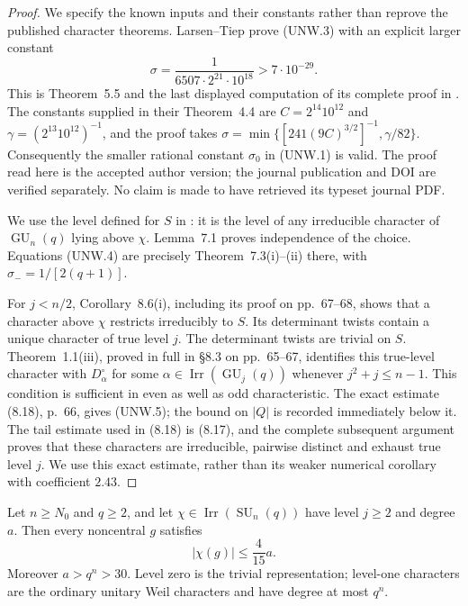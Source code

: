 \begin{proof}
We specify the known inputs and their constants rather than reprove
the published character theorems.
Larsen--Tiep prove (UNW.3) with an explicit larger constant
\[
 \sigma=\frac1{6507\cdot2^{21}\cdot10^{18}}>7\cdot10^{-29}.
                                                               \tag{UNW.6}
\]
This is Theorem~5.5 and the last displayed computation of its
complete proof in \cite[accepted-author version, pp.~25--26]{UNW:LT2024}.
The constants supplied in their Theorem~4.4 are
$C=2^{14}10^{12}$ and $\gamma=(2^{13}10^{12})^{-1}$, and the proof
takes
$\sigma=\min\{[241(9C)^{3/2}]^{-1},\gamma/82\}$.
Consequently the smaller rational constant $\sigma_0$ in (UNW.1)
is valid.  The proof read here is the accepted author version;
the journal publication and DOI are verified separately.  No claim
is made to have retrieved its typeset journal PDF.

We use the level defined for $S$ in
\cite[Definition~2 and Lemma~7.1, pp.~51--52]{UNW:GLT2020}:
it is the level of any irreducible character of
$\operatorname{GU}_n(q)$ lying above $\chi$.
Lemma~7.1 proves independence of the choice.  Equations (UNW.4)
are precisely Theorem~7.3(i)--(ii) there, with
$\sigma_-=1/[2(q+1)]$.

For $j<n/2$, Corollary~8.6(i), including its proof on pp.~67--68,
shows that a character above $\chi$ restricts irreducibly to $S$.
Its determinant twists contain a unique character of true level
$j$.  The determinant twists are trivial on $S$.
Theorem~1.1(iii), proved in full in \S8.3 on pp.~65--67, identifies
this true-level character with $D_\alpha^\circ$ for some
$\alpha\in\operatorname{Irr}(\operatorname{GU}_j(q))$ whenever
$j^2+j\le n-1$.  This condition is sufficient in even as well as
odd characteristic.  The exact estimate (8.18), p.~66, gives
(UNW.5); the bound on $|Q|$ is recorded immediately below it.
The tail estimate used in (8.18) is (8.17), and the complete
subsequent argument proves that these characters are irreducible,
pairwise distinct and exhaust true level $j$.
We use this exact estimate, rather than its weaker numerical
corollary with coefficient $2.43$.
\end{proof}

\begin{theorem}
\label{D-UNW-02}
Let $n\ge N_0$ and $q\ge2$, and let
$\chi\in\operatorname{Irr}(\operatorname{SU}_n(q))$ have level
$j\ge2$ and degree $a$.  Then every noncentral $g$ satisfies
\[
                         |\chi(g)|\le\frac4{15}a.            \tag{UNW.7}
\]
Moreover $a>q^n>30$.  Level zero is the trivial representation;
level-one characters are the ordinary unitary Weil characters
and have degree at most $q^n$.
\end{theorem}

